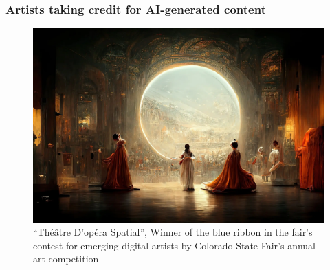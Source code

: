 \documentclass[
	11pt, compress%
]{beamer}
\begin{document}
\begin{frame}
		\frametitle{Artists taking credit for AI-generated content}
		\begin{figure}
			\includegraphics[width=0.78\linewidth]{Images/ColoradoStateFairWinner.png}
			\caption{\tiny “Théâtre D’opéra Spatial”, Winner of the blue ribbon in the fair’s contest for emerging digital artists by Colorado State Fair’s annual art competition}
		\end{figure}
	\end{frame}
\end{document}
